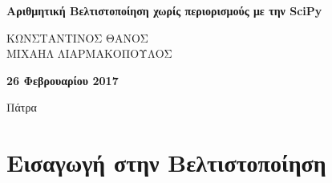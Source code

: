 \documentclass[a4paper,12pt,twoside]{report}
\theoremstyle{plain}
\theoremstyle{definition}
\theoremstyle{remark}
\begin{document}
\begin{center}
{\LARGE \bfseries Αριθμητική Βελτιστοποίηση χωρίς περιορισμούς με την SciPy}
\end{center}
\vspace*{1cm}
\setcounter{footnote}{1}

\renewcommand{\thefootnote}{\fnsymbol{footnote}}
\begin{center}
{\sc ΚΩΝΣΤΑΝΤΙΝΟΣ ΘΑΝΟΣ \\
	 ΜΙΧΑΗΛ ΛΙΑΡΜΑΚΟΠΟΥΛΟΣ
\\}
\vspace*{0.3cm}

 \vspace*{-.5cm} 
\end{center}

\setcounter{footnote}{1}


\vspace*{2.5cm}
\begin{center}
	{{\bf 26 Φεβρουαρίου 2017 \par{Πάτρα}}}
\end{center}
\vspace*{.05cm}

\renewcommand{\thefootnote}{\arabic{footnote}}
\setcounter{footnote}{1}
\pagebreak
\baselineskip 19pt

\tableofcontents

\newpage
\chapter{Εισαγωγή στην Βελτιστοποίηση}
\end{document}
